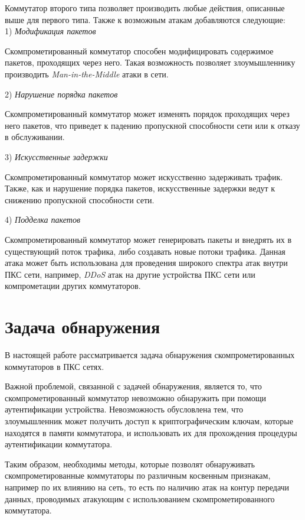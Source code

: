 \documentclass[../thesis.tex]{subfiles}
\begin{document}
Коммутатор второго типа позволяет производить любые действия, описанные выше для первого типа.
Также к возможным атакам добавляются следующие:
\\

1)	\textit{Модификация пакетов}

Скомпрометированный коммутатор способен модифицировать содержимое пакетов, проходящих через него.
Такая возможность позволяет злоумышленнику производить \textit{Man-in-the-Middle} атаки в сети.

2)	\textit{Нарушение порядка пакетов}

Скомпрометированный коммутатор может изменять порядок проходящих через него пакетов, что приведет к падению пропускной способности сети или к отказу в обслуживании.

3)	\textit{Искусственные задержки}

Скомпрометированный коммутатор может искусственно задерживать трафик.
Также, как и нарушение порядка пакетов, искусственные задержки ведут к снижению пропускной способности сети.

4)	\textit{Подделка пакетов}

Скомпрометированный коммутатор может генерировать пакеты и внедрять их в существующий поток трафика, либо создавать новые потоки трафика.
Данная атака может быть использована для проведения широкого спектра атак внутри ПКС сети, например, \textit{DDoS} атак \cite{mirkovic2004taxonomy} на другие устройства ПКС сети или компрометации других коммутаторов.

\pagebreak

\section{Задача обнаружения}

В настоящей работе рассматривается задача обнаружения скомпрометированных коммутаторов в ПКС сетях.

Важной проблемой, связанной с задачей обнаружения, является то, что скомпрометированный коммутатор невозможно обнаружить при помощи аутентификации устройства.
Невозможность обусловлена тем, что злоумышленник может получить доступ к криптографическим ключам, которые находятся в памяти коммутатора, и использовать их для прохождения процедуры аутентификации коммутатора.

Таким образом, необходимы методы, которые позволят обнаруживать скомпрометированные коммутаторы по различным косвенным признакам, например по их влиянию на сеть, то есть по наличию атак на контур передачи данных, проводимых атакующим с использованием скомпрометированного коммутатора.
\\
\end{document}
